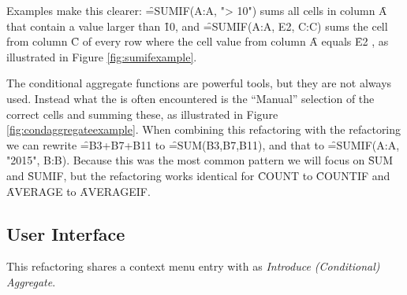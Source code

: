 Examples make this clearer: \f{=SUMIF(A:A, "> 10")} sums all cells in column \f{A} that contain a value larger than \f{10}, and \f{=SUMIF(A:A, E2, C:C)} sums the cell from column \f{C} of every row where the cell value from column \f{A} equals \f{E2} , as illustrated in Figure \ref{fig:sumifexample}.

The conditional aggregate functions are powerful tools, but they are not always used. 
Instead what the is often encountered is the ``Manual'' selection of the correct cells and summing these, as illustrated in Figure \ref{fig:condaggregateexample}.
When combining this refactoring with the  refactoring we can rewrite \f{=B3+B7+B11} to \f{=SUM(B3,B7,B11)}, and that to \f{=SUMIF(A:A, "2015", B:B)}.
Because this was the most common pattern we will focus on \f{SUM} and \f{SUMIF}, but the refactoring works identical for \f{COUNT} to \f{COUNTIF} and \f{AVERAGE} to \f{AVERAGEIF}.

\subsection{User Interface}

This refactoring shares a context menu entry with  as \emph{Introduce (Conditional) Aggregate}.

